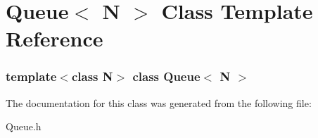 \hypertarget{classQueue}{
\section{Queue$<$ N $>$ Class Template Reference}
\label{classQueue}
}
\subsubsection*{template$<$class N$>$ class Queue$<$ N $>$}



The documentation for this class was generated from the following file:\begin{DoxyCompactItemize}
\item 
Queue.h\end{DoxyCompactItemize}
